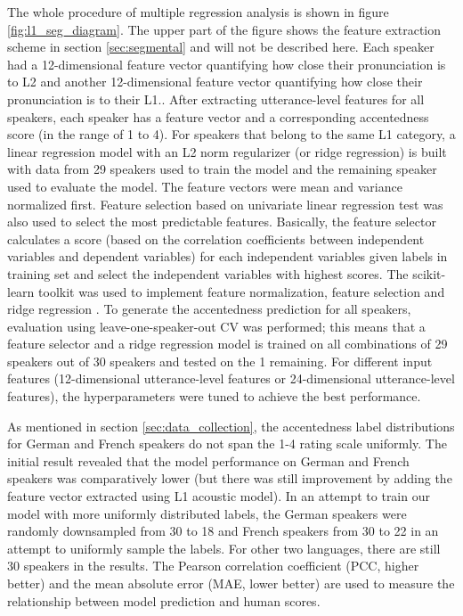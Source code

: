 The whole procedure of multiple regression analysis is shown in figure \ref{fig:l1_seg_diagram}. The upper part of the figure shows the feature extraction scheme in section \ref{sec:segmental} and will not be described here. Each speaker had a 12-dimensional feature vector quantifying how close their pronunciation is to L2 and another 12-dimensional feature vector quantifying how close their pronunciation is to their L1.. After extracting utterance-level features for all speakers, each speaker has a feature vector and a corresponding accentedness score (in the range of 1 to 4). For speakers that belong to the same L1 category, a linear regression model with an L2 norm regularizer (or ridge regression) is built with data from 29 speakers used to train the model and the remaining speaker used to evaluate the model. The feature vectors were mean and variance normalized first. Feature selection based on univariate linear regression test \citep{saeys2007review} was also used to select the most predictable features. Basically, the feature selector calculates a score (based on the correlation coefficients between independent variables and dependent variables) for each independent variables given labels in training set and select the independent variables with highest scores. The scikit-learn toolkit was used to implement feature normalization, feature selection and ridge regression \citep{scikit-learn}. To generate the accentedness prediction for all speakers, evaluation using leave-one-speaker-out CV was performed; this means that a feature selector and a ridge regression model is trained on all combinations of 29 speakers out of 30 speakers and tested on the 1 remaining. For different input features (12-dimensional utterance-level features or 24-dimensional utterance-level features), the hyperparameters were tuned to achieve the best performance.

As mentioned in section \ref{sec:data_collection}, the accentedness label distributions for German and French speakers do not span the 1-4 rating scale uniformly. The initial result revealed that the model performance on German and French speakers was comparatively lower (but there was still improvement by adding the feature vector extracted using L1 acoustic model). In an attempt to train our model with more uniformly distributed labels, the German speakers were randomly downsampled from 30 to 18 and French speakers from 30 to 22 in an attempt to uniformly sample the labels. For other two languages, there are still 30 speakers in the results. The Pearson correlation coefficient (PCC, higher better) and the mean absolute error (MAE, lower better) are used to measure the relationship between model prediction and human scores.

